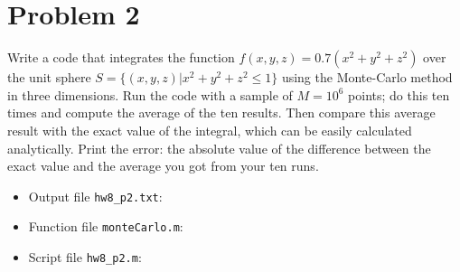 \section{Problem 2}%
\label{sec:problem_2}
Write a code that integrates the function $f(x, y, z) = 0.7 (x^{2} + y^{2} + z^{2})$ over the unit sphere $S = \{(x, y, z) | x^{2} + y^{2} + z^{2} \leq 1 \}$ using the Monte-Carlo method in three dimensions. Run the code with a sample of $M = 10^{6}$ points; do this ten times and compute the average of the ten results. Then compare this average result with the exact value of the integral, which can be easily calculated analytically. Print the error: the absolute value of the difference between the exact value and the average you got from your ten runs.
\begin{solution}
  \quad
  \begin{itemize}
  \item Output file \verb|hw8_p2.txt|:
    
  \item Function file \verb|monteCarlo.m|:
    
  \item Script file \verb|hw8_p2.m|:
    
  \end{itemize}
\end{solution}

